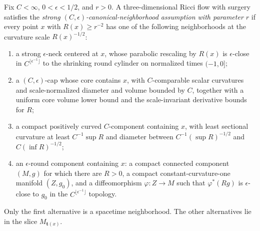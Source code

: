 \begin{definition}
\label{def:strong-canonical-neighborhood-control}
\notready
Fix $C<\infty$, $0<\epsilon<1/2$, and $r>0$.  A three-dimensional Ricci
flow with surgery satisfies the \emph{strong
$(C,\epsilon)$-canonical-neighborhood assumption with parameter $r$} if
every point $x$ with $R(x)\ge r^{-2}$ has one of the following
neighborhoods at the curvature scale $R(x)^{-1/2}$:
\begin{enumerate}
\item a strong $\epsilon$-neck centered at $x$, whose parabolic rescaling by
      $R(x)$ is $\epsilon$-close in
      $C^{\lfloor\epsilon^{-1}\rfloor}$ to the shrinking round cylinder on
      normalized times $(-1,0]$;
\item a $(C,\epsilon)$-cap whose core contains $x$, with $C$-comparable
      scalar curvatures and scale-normalized diameter and volume bounded by
      $C$, together with a uniform core volume lower bound and the
      scale-invariant derivative bounds for $R$;
\item a compact positively curved $C$-component containing $x$, with
      least sectional curvature at least $C^{-1}\sup R$ and diameter between
      $C^{-1}(\sup R)^{-1/2}$ and $C(\inf R)^{-1/2}$;
\item an $\epsilon$-round component containing $x$: a compact connected
      component $(M,g)$ for which there are $R>0$, a compact
      constant-curvature-one manifold $(Z,g_0)$, and a diffeomorphism
      $\varphi:Z\to M$ such that $\varphi^*(Rg)$ is $\epsilon$-close to $g_0$
      in the $C^{\lfloor\epsilon^{-1}\rfloor}$ topology.
\end{enumerate}
Only the first alternative is a spacetime neighborhood.  The other
alternatives lie in the slice $M_{\mathbf t(x)}$.
\end{definition}

